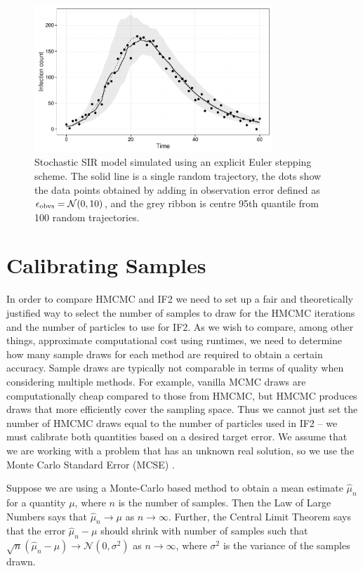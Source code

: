     \begin{figure}
        \centering
        \captionsetup{width=.8\linewidth}
        \includegraphics[width=0.8\textwidth]{./images/sirmean.pdf}
        \caption{Stochastic SIR model simulated using an explicit Euler stepping scheme. The solid line is a single random trajectory, the dots show the data points obtained by adding in observation error defined as $\epsilon_{\small\text{obvs}} = \mathcal{N}(0,10)$, and the grey ribbon is centre 95th quantile from 100 random trajectories. \label{sirmean}}
    \end{figure}


\section{Calibrating Samples}

	In order to compare HMCMC and IF2 we need to set up a fair and theoretically justified way to select the number of samples to draw for the HMCMC iterations and the number of particles to use for IF2. As we wish to compare, among other things, approximate computational cost using runtimes, we need to determine how many sample draws for each method are required to obtain a certain accuracy. Sample draws are typically not comparable in terms of quality when considering multiple methods. For example, vanilla MCMC draws are computationally cheap compared to those from HMCMC, but HMCMC produces draws that more efficiently cover the sampling space. Thus we cannot just set the number of HMCMC draws equal to the number of particles used in IF2 -- we must calibrate both quantities based on a desired target error. We assume that we are working with a problem that has an unknown real solution, so we use the Monte Carlo Standard Error (MCSE) \cite{Harding2014}.

	Suppose we are using a Monte-Carlo based method to obtain a mean estimate $\hat{\mu}_{n}$ for a quantity $\mu$, where $n$ is the number of samples. Then the Law of Large Numbers says that $\hat{\mu}_{n} \rightarrow \mu$ as $n \rightarrow \infty$. Further, the Central Limit Theorem says that the error $\hat{\mu}_{n} - \mu$ should shrink with number of samples such that $\sqrt{n} (\hat{\mu}_{n} - \mu) \rightarrow \mathcal{N}(0,\sigma^2)$ as $n \rightarrow \infty$, where $\sigma^2$ is the variance of the samples drawn.

